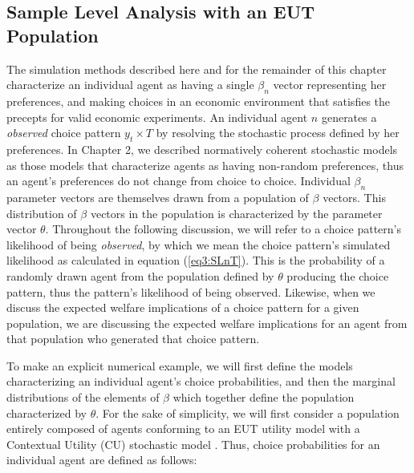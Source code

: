 \documentclass[../main.tex]{subfiles}
\begin{document}
\subsection{Sample Level Analysis with an EUT Population}

The simulation methods described here and for the remainder of this chapter characterize an individual agent as having a single $\beta_n$ vector representing her preferences, and making choices in an economic environment that satisfies the \textcite{Smith1982} precepts for valid economic experiments.
An individual agent $n$ generates a \textit{observed} choice pattern $y_t \times T$ by resolving the stochastic process defined by her preferences.
In Chapter 2, we described normatively coherent stochastic models as those models that characterize agents as having non-random preferences, thus an agent's preferences do not change from choice to choice.{\footnotemark}
Individual $\beta_n$ parameter vectors are themselves drawn from a population of $\beta$ vectors.
This distribution of $\beta$ vectors in the population is characterized by the parameter vector $\theta$.
Throughout the following discussion, we will refer to a choice pattern's likelihood of being \textit{observed}, by which we mean the choice pattern's simulated likelihood as calculated in equation (\ref{eq3:SLnT}).
This is the probability of a randomly drawn agent from the population defined by $\theta$ producing the choice pattern, thus the pattern's likelihood of being observed.
Likewise, when we discuss the expected welfare implications of a choice pattern for a given population, we are discussing the expected welfare implications for an agent from that population who generated that choice pattern.

To make an explicit numerical example, we will first define the models characterizing an individual agent's choice probabilities, and then the marginal distributions of the elements of $\beta$ which together define the population characterized by $\theta$.
For the sake of simplicity, we will first consider a population entirely composed of agents conforming to an EUT utility model with a Contextual Utility (CU) stochastic model \parencite{Wilcox2008}.
Thus, choice probabilities for an individual agent are defined as follows:

\addtocounter{footnote}{-1}
\end{document}
